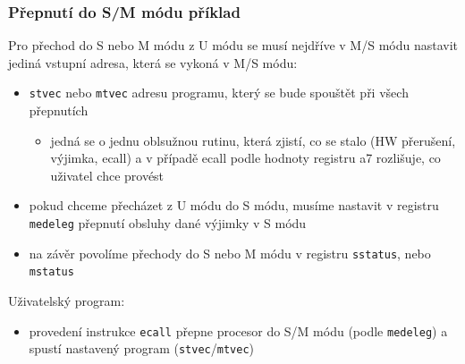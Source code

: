 \documentclass[aspectratio=169]{beamer}
\begin{document}
\begin{frame}
\frametitle{Přepnutí do S/M módu příklad}

Pro přechod do S nebo M módu z U módu se musí nejdříve v M/S módu nastavit jediná vstupní adresa, která se vykoná v M/S módu:
\begin{itemize}
\item \texttt{stvec} nebo \texttt{mtvec} adresu programu, který se bude spouštět při všech přepnutích
 \begin{itemize}
 \item jedná se o jednu oblsužnou rutinu, která zjistí, co se stalo (HW přerušení, výjimka, ecall) a v případě ecall podle hodnoty registru a7 rozlišuje, co uživatel chce provést
 \end{itemize}
\item pokud chceme přecházet z U módu do S módu, musíme nastavit v registru \texttt{medeleg} přepnutí obsluhy dané výjimky v S módu
\item na závěr povolíme přechody do S nebo M módu v registru \texttt{sstatus}, nebo \texttt{mstatus}
\end{itemize}

Uživatelský program:
\begin{itemize}
\item provedení instrukce \texttt{ecall} přepne procesor do S/M módu (podle \texttt{medeleg}) a spustí nastavený program (\texttt{stvec}/\texttt{mtvec})
\end{itemize}
\end{frame}
\end{document}
